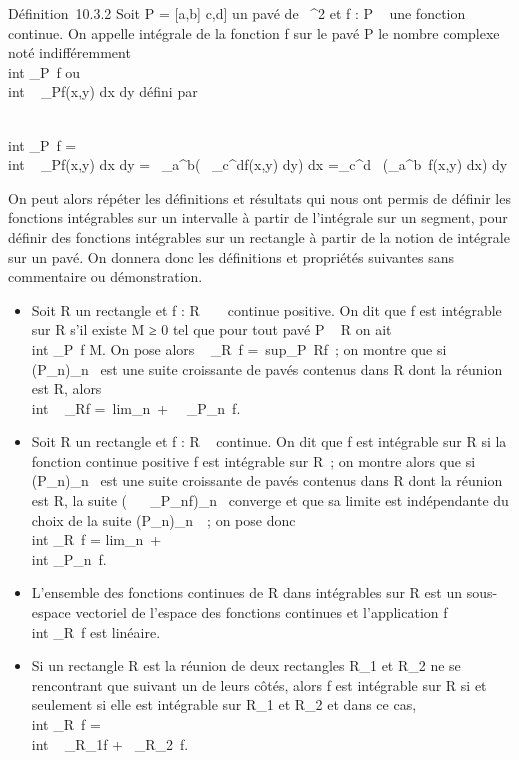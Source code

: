 \documentclass[]{article}
\begin{document}
Définition~10.3.2 Soit P = {[}a,b{]} \times {[}c,d{]} un pavé de
~^2 et f : P \rightarrow~  une fonction continue. On appelle intégrale
de la fonction f sur le pavé P le nombre complexe noté indifféremment
\int  \\int  _P~f
ou \int  \\int ~
_Pf(x,y) dx dy défini par

\int  \\int  _P~f
=\int  \\int ~
_Pf(x,y) dx dy =\int ~
_a^b\left (\int ~
_c^df(x,y) dy\right ) dx
=\int  _c^d~\left
(\int  _a^b~f(x,y)
dx\right ) dy

On peut alors répéter les définitions et résultats qui nous ont permis
de définir les fonctions intégrables sur un intervalle à partir de
l'intégrale sur un segment, pour définir des fonctions intégrables sur
un rectangle à partir de la notion de intégrale sur un pavé. On donnera
donc les définitions et propriétés suivantes sans commentaire ou
démonstration.

\begin{itemize}
\itemsep1pt\parskip0pt
\item
  Soit R un rectangle et f : R \rightarrow~ ~ continue positive. On dit que f est
  intégrable sur R s'il existe M ≥ 0 tel que pour tout pavé P \subset~ R on ait
  \int  \\int  _P~f
  \leq M. On pose alors \int ~
  \int  _R~f =\
  sup_P\subset~Rf~; on montre que si (P_n)_n\in{}~ est
  une suite croissante de pavés contenus dans R dont la réunion est R,
  alors \int  \\int ~
  _Rf =\
  lim_n\rightarrow~+\infty~\int ~
  \int  _P_n~f.
\item
  Soit R un rectangle et f : R \rightarrow~  continue. On dit que f est intégrable
  sur R si la fonction continue positive f est
  intégrable sur R~; on montre alors que si (P_n)_n\in\mathbb{N}~
  est une suite croissante de pavés contenus dans R dont la réunion est
  R, la suite \left (\int ~
  \int ~
  _P_nf\right )_n\in{}~ converge et
  que sa limite est indépendante du choix de la suite
  (P_n)_n\in\mathbb{N}~~; on pose donc \\int
   \int  _R~f
  = lim_n\rightarrow~+\infty~~\\int
   \int  _P_n~f.
\item
  L'ensemble des fonctions continues de R dans  intégrables sur R est
  un sous-espace vectoriel de l'espace des fonctions continues et
  l'application f\mapsto~\\int
   \int  _R~f est linéaire.
\item
  Si un rectangle R est la réunion de deux rectangles R_1 et
  R_2 ne se rencontrant que suivant un de leurs côtés, alors f
  est intégrable sur R si et seulement si elle est intégrable sur
  R_1 et R_2 et dans ce cas, \\int
   \int  _R~f
  =\int  \\int ~
  _R_1f +\int ~
  \int  _R_2~f.
\end{itemize}
\end{document}
